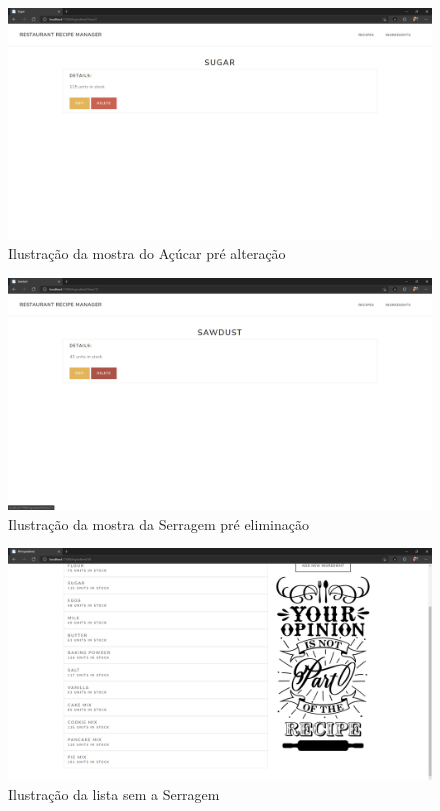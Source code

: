 \FloatBarrier
\begin{figure}[!hbt]
    \centering
    \includegraphics[width=14cm]{Resources/WebApp/Ingredients/ingredient (4).png}
    \caption{Ilustração da mostra do Açúcar pré alteração}
    
\end{figure}
\FloatBarrier
\begin{figure}[!hbt]
    \centering
    \includegraphics[width=14cm]{Resources/WebApp/Ingredients/ingredient (5).png}
    \caption{Ilustração da mostra da Serragem pré eliminação}
    
\end{figure}
\FloatBarrier
\begin{figure}[!hbt]
    \centering
    \includegraphics[width=14cm]{Resources/WebApp/Ingredients/ingredient (6).png}
    \caption{Ilustração da lista sem a Serragem}
    
\end{figure}
